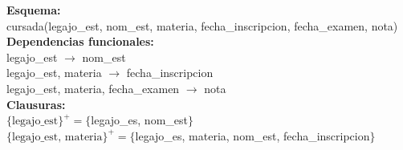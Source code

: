\documentclass[preview]{standalone}
\begin{document}
\textbf{Esquema:}\\
cursada(legajo\_est, nom\_est, materia, fecha\_inscripcion, fecha\_examen, nota)\\

\textbf{Dependencias funcionales:}\\
legajo\_est $\rightarrow$ nom\_est\\
legajo\_est, materia $\rightarrow$ fecha\_inscripcion\\
legajo\_est, materia, fecha\_examen $\rightarrow$ nota\\

\textbf{Clausuras:}\\
$\big\{\text{legajo\_est}\big\}^+ = \big\{$legajo\_es, nom\_est$\big\}$\\
$\big\{\text{legajo\_est, materia}\big\}^+ = \big\{$legajo\_es, materia, nom\_est, fecha\_inscripcion$\big\}$\\
\end{document}
